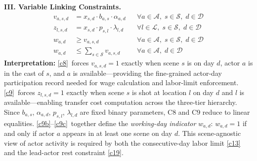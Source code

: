 \medskip
\noindent\textbf{III. Variable Linking Constraints.}
\vspace{-4pt}
\begin{align}
v_{a,s,d} &= x_{s,d} \cdot b_{a,s} \cdot \alpha_{a,d} && \forall a \in \mathcal{A},\; s \in \mathcal{S},\; d \in \mathcal{D} \tag{C8}\label{c8}\\
z_{l,s,d} &= x_{s,d} \cdot p_{s,l} \cdot \lambda_{l,d} && \forall l \in \mathcal{L},\; s \in \mathcal{S},\; d \in \mathcal{D} \tag{C9}\label{c9}\\
w_{a,d} &\geq v_{a,s,d} && \forall a \in \mathcal{A},\; s \in \mathcal{S},\; d \in \mathcal{D} \tag{C9b}\label{c9b}\\
w_{a,d} &\leq \sum_{s \in \mathcal{S}} v_{a,s,d} && \forall a \in \mathcal{A},\; d \in \mathcal{D} \tag{C9c}\label{c9c}
\end{align}
\textbf{Interpretation:}
\ref{c8}~forces $v_{a,s,d} = 1$ exactly when scene $s$ is on day $d$, actor $a$ is in the cast of $s$, and $a$ is available---providing the fine-grained actor-day participation record needed for wage calculation and labor-limit enforcement.
\ref{c9}~forces $z_{l,s,d} = 1$ exactly when scene $s$ is shot at location $l$ on day $d$ and $l$ is available---enabling transfer cost computation across the three-tier hierarchy.
Since $b_{a,s}$, $\alpha_{a,d}$, $p_{s,l}$, $\lambda_{l,d}$ are fixed binary parameters, C8 and C9 reduce to linear equalities.
\ref{c9b}--\ref{c9c}~together define the \emph{working-day indicator} $w_{a,d}$: $w_{a,d} = 1$ if and only if actor $a$ appears in at least one scene on day $d$.
This scene-agnostic view of actor activity is required by both the consecutive-day labor limit \ref{c13} and the lead-actor rest constraint \ref{c19}.

